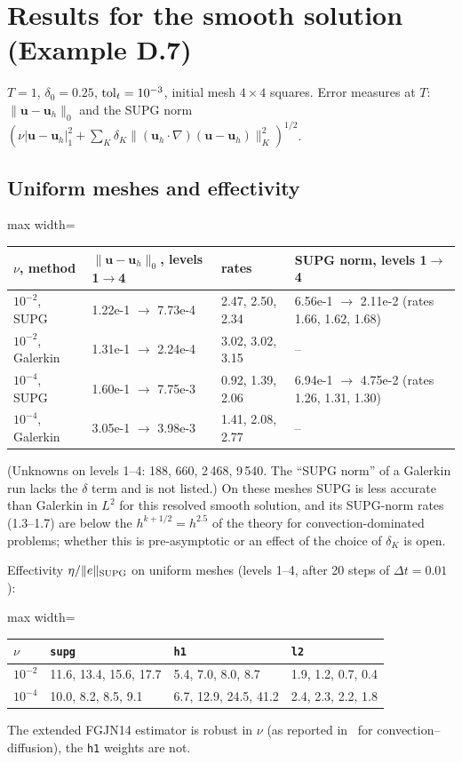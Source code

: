 \documentclass[11pt,a4paper]{article}
\newcommand{\bu}{\boldsymbol{u}}
\newcommand{\dt}{\Delta t}
\newcommand{\code}[1]{\texttt{#1}}
\begin{document}
\section{Results for the smooth solution (Example D.7)}

$T=1$, $\delta_0=0.25$, ${\rm tol}_t=10^{-3}$, initial mesh $4\times4$ squares. Error measures at $T$: $\|\bu-\bu_h\|_0$ and
the SUPG norm $(\nu|\bu-\bu_h|_1^2+\sum_K\delta_K\|(\bu_h\cdot\nabla)(\bu-\bu_h)\|_K^2)^{1/2}$.

\subsection{Uniform meshes and effectivity}

\begin{center}\begin{adjustbox}{max width=\textwidth}
\begin{tabular}{llll}
\toprule
$\nu$, method & $\|\bu-\bu_h\|_0$, levels 1$\to$4 & rates & SUPG norm, levels 1$\to$4\\
\midrule
$10^{-2}$, SUPG & 1.22e-1 $\to$ 7.73e-4 & 2.47, 2.50, 2.34 & 6.56e-1 $\to$ 2.11e-2 (rates 1.66, 1.62, 1.68)\\
$10^{-2}$, Galerkin & 1.31e-1 $\to$ 2.24e-4 & 3.02, 3.02, 3.15 & --\\
$10^{-4}$, SUPG & 1.60e-1 $\to$ 7.75e-3 & 0.92, 1.39, 2.06 & 6.94e-1 $\to$ 4.75e-2 (rates 1.26, 1.31, 1.30)\\
$10^{-4}$, Galerkin & 3.05e-1 $\to$ 3.98e-3 & 1.41, 2.08, 2.77 & --\\
\bottomrule
\end{tabular}
\end{adjustbox}\end{center}
(Unknowns on levels 1--4: 188, 660, 2\,468, 9\,540. The ``SUPG norm'' of a Galerkin run lacks the $\delta$ term and is not
listed.) On these meshes SUPG is less accurate than Galerkin in $L^2$ for this resolved smooth solution, and its SUPG-norm
rates (1.3--1.7) are below the $h^{k+1/2}=h^{2.5}$ of the theory for convection-dominated problems; whether this is
pre-asymptotic or an effect of the choice of $\delta_K$ is open.

Effectivity $\eta/\|e\|_{\rm SUPG}$ on uniform meshes (levels 1--4, after 20 steps of $\dt=0.01$):
\begin{center}\begin{adjustbox}{max width=\textwidth}
\begin{tabular}{llll}
\toprule
$\nu$ & \code{supg} & \code{h1} & \code{l2}\\
\midrule
$10^{-2}$ & 11.6, 13.4, 15.6, 17.7 & 5.4, 7.0, 8.0, 8.7 & 1.9, 1.2, 0.7, 0.4\\
$10^{-4}$ & 10.0, 8.2, 8.5, 9.1 & 6.7, 12.9, 24.5, 41.2 & 2.4, 2.3, 2.2, 1.8\\
\bottomrule
\end{tabular}
\end{adjustbox}\end{center}
The extended FGJN14 estimator is robust in $\nu$ (as reported in~\cite{FGJN14} for convection--diffusion), the \code{h1}
weights are not.
\end{document}
